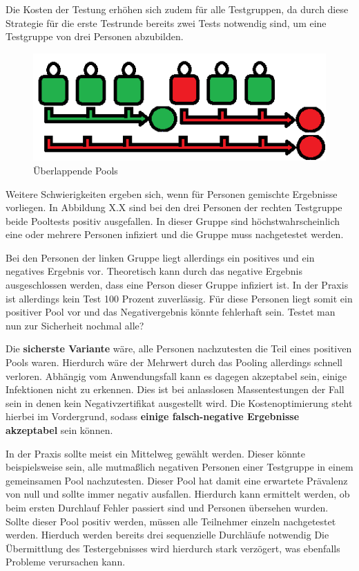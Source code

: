 Die Kosten der Testung erhöhen sich zudem für alle Testgruppen, da durch diese Strategie für die erste Testrunde bereits zwei Tests notwendig sind, um eine Testgruppe von drei Personen abzubilden.

\begin{figure}[h]
	\centering
	\includegraphics[width=.8\textwidth]{img/GrossePooluebersicht}
	\caption{Überlappende Pools\footnotemark}
\end{figure}

Weitere Schwierigkeiten ergeben sich, wenn für Personen gemischte Ergebnisse vorliegen.
In Abbildung X.X sind bei den drei Personen der rechten Testgruppe beide Pooltests positiv ausgefallen.
In dieser Gruppe sind höchstwahrscheinlich eine oder mehrere Personen infiziert und die Gruppe muss nachgetestet werden.

Bei den Personen der linken Gruppe liegt allerdings ein positives und ein negatives Ergebnis vor.
Theoretisch kann durch das negative Ergebnis ausgeschlossen werden, dass eine Person dieser Gruppe infiziert ist.
In der Praxis ist allerdings kein Test 100 Prozent zuverlässig.
Für diese Personen liegt somit ein positiver Pool vor und das Negativergebnis könnte fehlerhaft sein.
Testet man nun zur Sicherheit nochmal alle?

Die \textbf{sicherste Variante} wäre, alle Personen nachzutesten die Teil eines positiven Pools waren.
Hierdurch wäre der Mehrwert durch das Pooling allerdings schnell verloren.
Abhängig vom Anwendungsfall kann es dagegen akzeptabel sein, einige Infektionen nicht zu erkennen.
Dies ist bei anlasslosen Massentestungen der Fall sein in denen kein Negativzertifikat ausgestellt wird.
Die Kostenoptimierung steht hierbei im Vordergrund, sodass \textbf{einige falsch-negative Ergebnisse akzeptabel} sein können. 

In der Praxis sollte meist ein Mittelweg gewählt werden.
Dieser könnte beispielsweise sein, alle mutmaßlich negativen Personen einer Testgruppe in einem gemeinsamen Pool nachzutesten.
Dieser Pool hat damit eine erwartete Prävalenz von null und sollte immer negativ ausfallen.
Hierdurch kann ermittelt werden, ob beim ersten Durchlauf Fehler passiert sind und Personen übersehen wurden.
Sollte dieser Pool positiv werden, müssen alle Teilnehmer einzeln nachgetestet werden.
Hierduch werden bereits drei sequenzielle Durchläufe notwendig
Die Übermittlung des Testergebnisses wird hierdurch stark verzögert, was ebenfalls Probleme verursachen kann.

